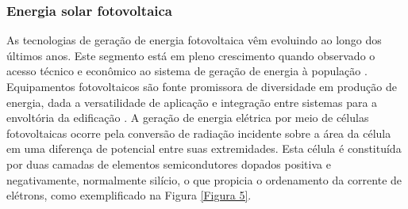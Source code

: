 \begin{onehalfspace}
    \subsubsection{Energia solar fotovoltaica}
    As tecnologias de geração de energia fotovoltaica vêm evoluindo ao longo dos últimos anos. 
    Este segmento está em pleno crescimento quando observado o acesso técnico e econômico ao sistema de 
    geração de energia à população \cite{Pereira2017}. Equipamentos fotovoltaicos são fonte promissora 
    de diversidade em produção de energia, dada a versatilidade de aplicação e integração entre 
    sistemas para a envoltória da edificação \cite{Sorgato2018}.\vspace{0.3cm} \newline
    A geração de energia elétrica por meio de células fotovoltaicas ocorre pela conversão de radiação 
    incidente sobre a área da célula em uma diferença de potencial entre suas extremidades. Esta célula 
    é constituída por duas camadas de elementos semicondutores dopados positiva e negativamente, 
    normalmente silício, o que propicia o ordenamento da corrente de elétrons, como exemplificado na 
    Figura \ref{Figura 5}.


\end{onehalfspace}
